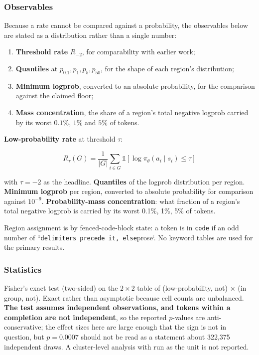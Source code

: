 \documentclass[
  11pt,
]{article}
\providecommand{\tightlist}{%
  \setlength{\itemsep}{0pt}\setlength{\parskip}{0pt}}
\begin{document}
\hypertarget{observables}{%
\subsubsection{Observables}\label{observables}}

Because a rate cannot be compared against a probability, the observables
below are stated as a distribution rather than a single number:

\begin{enumerate}
\def\labelenumi{\arabic{enumi}.}
\tightlist
\item
  \textbf{Threshold rate} \(R_{-2}\), for comparability with earlier
  work;
\item
  \textbf{Quantiles} at \(p_{0.1}, p_1, p_5, p_{50}\), for the shape of
  each region's distribution;
\item
  \textbf{Minimum logprob}, converted to an absolute probability, for
  the comparison against the claimed floor;
\item
  \textbf{Mass concentration}, the share of a region's total negative
  logprob carried by its worst \(0.1\%\), \(1\%\) and \(5\%\) of tokens.
\end{enumerate}

\textbf{Low-probability rate} at threshold \(\tau\):

\[R_\tau(G) = \frac{1}{|G|}\sum_{i \in G}\mathbb{1}\left[\log\pi_\theta(a_i \mid s_i) \le \tau\right]\]

with \(\tau = -2\) as the headline. \textbf{Quantiles} of the logprob
distribution per region. \textbf{Minimum logprob} per region, converted
to absolute probability for comparison against \(10^{-9}\).
\textbf{Probability-mass concentration}: what fraction of a region's
total negative logprob is carried by its worst 0.1\%, 1\%, 5\% of
tokens.

Region assignment is by fenced-code-block state: a token is in
\texttt{code} if an odd number of
``\texttt{delimiters\ precede\ it,\ else}prose`. No keyword tables are
used for the primary results.

\hypertarget{statistics}{%
\subsubsection{Statistics}\label{statistics}}

Fisher's exact test (two-sided) on the \(2\times2\) table of
(low-probability, not) × (in group, not). Exact rather than asymptotic
because cell counts are unbalanced. \textbf{The test assumes independent
observations, and tokens within a completion are not independent}, so
the reported \(p\)-values are anti-conservative; the effect sizes here
are large enough that the sign is not in question, but \(p=0.0007\)
should not be read as a statement about 322,375 independent draws. A
cluster-level analysis with run as the unit is not reported.
\end{document}
